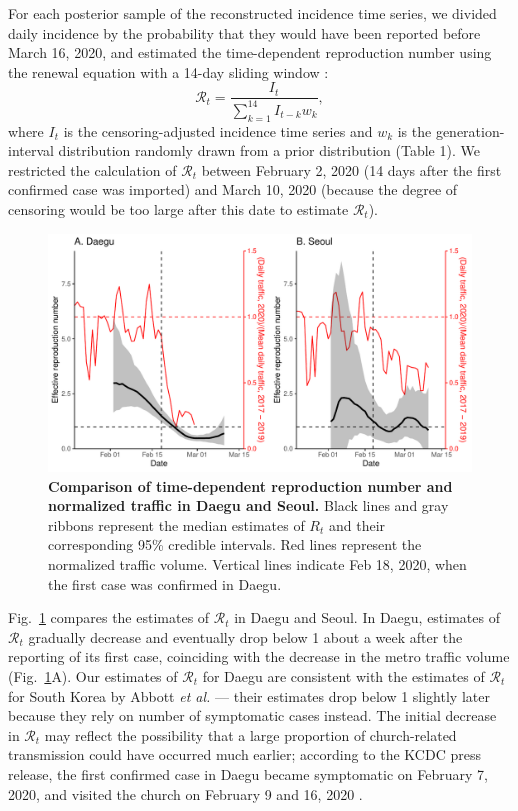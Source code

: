 \documentclass[12pt]{article}
\newcommand{\fref}[1]{Fig.~\ref{fig:#1}}
\begin{document}
For each posterior sample of the reconstructed incidence time series, we divided daily incidence by the probability that they would have been reported before March 16, 2020, and estimated the time-dependent reproduction number using the renewal equation with a 14-day sliding window \citep{fraser2007estimating}:
\begin{equation}
\mathcal R_t = \frac{I_t}{\sum_{k=1}^{14} I_{t-k} w_k},
\end{equation}
where $I_t$ is the censoring-adjusted incidence time series and $w_k$ is the generation-interval distribution randomly drawn from a prior distribution (Table 1).
We restricted the calculation of $\mathcal R_t$ between February 2, 2020 (14 days after the first confirmed case was imported) and March 10, 2020 (because the degree of censoring would be too large after this date to estimate $\mathcal R_t$).

\begin{figure}[!ht]
\includegraphics[width=\textwidth]{figure_compare_R_t.pdf}
\caption{
\textbf{Comparison of time-dependent reproduction number and normalized traffic in Daegu and Seoul.}
Black lines and gray ribbons represent the median estimates of $R_t$ and their corresponding 95\% credible intervals.
Red lines represent the normalized traffic volume.
Vertical lines indicate Feb 18, 2020, when the first case was confirmed in Daegu.
}
\label{fig:eff}
\end{figure}

\fref{eff} compares the estimates of $\mathcal R_t$ in Daegu and Seoul.
In Daegu, estimates of $\mathcal R_t$ gradually decrease and eventually drop below 1 about a week after the reporting of its first case, coinciding with the decrease in the metro traffic volume (\fref{eff}A).
Our estimates of $\mathcal R_t$ for Daegu are consistent with the estimates of $\mathcal R_t$ for South Korea by Abbott \textit{et al.} \cite{tempvar} --- their estimates drop below 1 slightly later because they rely on number of symptomatic cases instead.
The initial decrease in $\mathcal R_t$ may reflect the possibility that a large proportion of church-related transmission could have occurred much earlier; according to the KCDC press release, the first confirmed case in Daegu became symptomatic on February 7, 2020, and visited the church on February 9 and 16, 2020 \citep{kcdc}.
\end{document}
